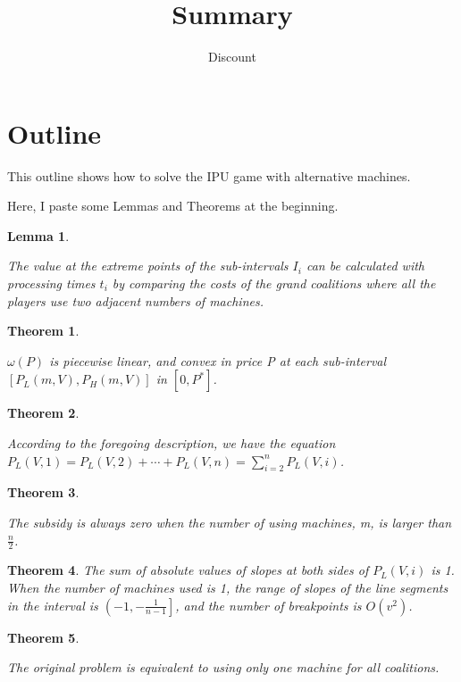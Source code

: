 \documentclass[UTF8]{article}
\title{Summary}
\author{Dis\cdot count}
\newtheorem{thm}{\hspace{2em}Theorem}
\newtheorem{lem}{\hspace{2em}Lemma}
\begin{document}
\maketitle{}


\section{Outline}

This outline shows how to solve the IPU game with alternative machines.

Here, I paste some Lemmas and Theorems at the beginning.

\begin{lem}\label{lem1}

The value at the extreme points of the sub-intervals $I_i$ can be calculated with processing times $t_i$ by comparing the costs of the grand coalitions where all the players use two adjacent numbers of machines.

\end{lem}

\begin{thm}\label{thm1}

$\omega(P)$ is piecewise linear, and convex in price P at each sub-interval $[P_L(m,V),P_H(m,V)]$ in $[0,P^*] $.

\end{thm}

\begin{thm}\label{thm2}

According to the foregoing description, we have the equation $P_L(V,1)=P_L(V,2)+\cdots+P_L(V,n)=\sum_{i=2}^n P_L(V,i)$.

\end{thm}

\begin{thm}\label{thm3}

The subsidy is always zero when the number of using machines, m, is larger than $\frac{n}{2}$.

\end{thm}


\begin{thm}\label{thm4}
The sum of absolute values of slopes at both sides of $P_L(V,i)$ is 1.
When the number of machines used is 1, the range of slopes of the line segments in the interval is $\left( -1 , -\frac{1}{n-1} \right]$, and the number of breakpoints is $ O(v^2) $.
\end{thm}


\begin{thm}\label{thm5}

The original problem is equivalent to using only one machine for all coalitions.

\end{thm}
\end{document}
